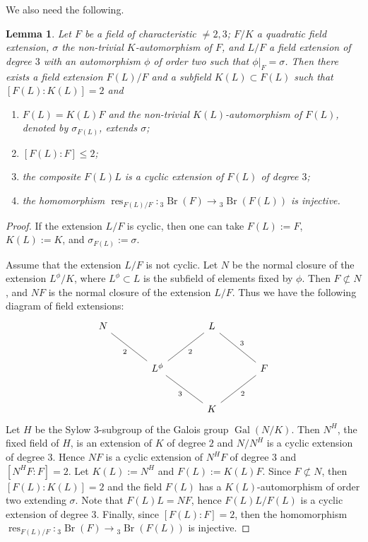\documentclass[10pt]{article}
\newtheorem{lemma}[theorem]{Lemma}
\theoremstyle{definition}
\DeclareMathOperator{\Br}{Br}
\DeclareMathOperator{\Gal}{Gal}
\DeclareMathOperator{\res}{res}
\newcommand{\bthree}[1]{{}_3\Br(#1)}
\newcommand{\sourcepage}[1]{\label{source-page-#1}}
\begin{document}
We also need the following.
\begin{lemma}\label{lem-cyclic}
Let $F$ be a field of characteristic $\neq2,3$; $F/K$ a quadratic field extension, $\sigma$ the non-trivial $K$-automorphism of $F$, and $L/F$ a field extension of degree $3$ with an automorphism $\phi$ of order two such that $\phi|_F=\sigma$. Then there exists a field extension $F(L)/F$ and a subfield $K(L)\subset F(L)$ such that $[F(L):K(L)]=2$ and
\begin{enumerate}
\item $F(L)=K(L)F$ and the non-trivial $K(L)$-automorphism of $F(L)$, denoted by $\sigma_{F(L)}$, extends $\sigma$;
\item $[F(L):F]\leq2$;
\item the composite $F(L)L$ is a cyclic extension of $F(L)$ of degree $3$;
\item the homomorphism $\res_{F(L)/F}:\bthree F\to\bthree{F(L)}$ is injective.
\end{enumerate}
\end{lemma}
\begin{proof}
If the extension $L/F$ is cyclic, then one can take $F(L):=F$, $K(L):=K$, and $\sigma_{F(L)}:=\sigma$.

Assume that the extension $L/F$ is not cyclic. Let $N$ be the normal closure of the extension $L^\phi/K$, where $L^\phi\subset L$ is the subfield of elements fixed by $\phi$. Then $F\not\subset N$, and
\newpage
\sourcepage{5}
$NF$ is the normal closure of the extension $L/F$. Thus we have the following diagram of field extensions:
\[
\begin{tikzcd}[column sep=large,row sep=large]
N\arrow[dr,dash,"2"'] & {} & L\arrow[dl,dash,"2"]\arrow[dr,dash,"3"] & {}\\
{} & L^\phi\arrow[dr,dash,"3"'] & {} & F\arrow[dl,dash,"2"]\\
{} & {} & K & {}
\end{tikzcd}
\]
Let $H$ be the Sylow $3$-subgroup of the Galois group $\Gal(N/K)$. Then $N^H$, the fixed field of $H$, is an extension of $K$ of degree $2$ and $N/N^H$ is a cyclic extension of degree $3$. Hence $NF$ is a cyclic extension of $N^HF$ of degree $3$ and $[N^HF:F]=2$. Let $K(L):=N^H$ and $F(L):=K(L)F$. Since $F\not\subset N$, then $[F(L):K(L)]=2$ and the field $F(L)$ has a $K(L)$-automorphism of order two extending $\sigma$. Note that $F(L)L=NF$, hence $F(L)L/F(L)$ is a cyclic extension of degree $3$. Finally, since $[F(L):F]=2$, then the homomorphism $\res_{F(L)/F}:\bthree F\to\bthree{F(L)}$ is injective.
\end{proof}
\end{document}
